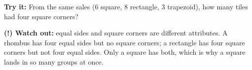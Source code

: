 \documentclass[12pt]{article}
\begin{document}
\begin{tryitbox}
\textbf{Try it:} \quad From the same sales ($6$ square, $8$ rectangle, $3$ trapezoid), how many tiles
had four square corners?\\[2pt]
\end{tryitbox}

\begin{watchoutbox}
\textbf{(!) Watch out:} equal sides and square corners are different attributes. A rhombus has four
equal sides but no square corners; a rectangle has four square corners but not four equal sides. Only
a square has both, which is why a square lands in so many groups at once.
\end{watchoutbox}
\end{document}
